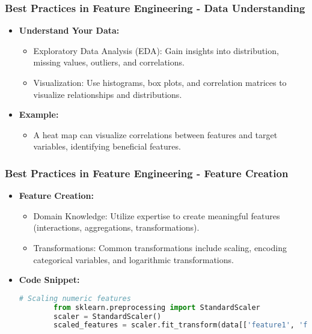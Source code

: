 \documentclass[aspectratio=169]{beamer}
\begin{document}
\begin{frame}[fragile]
    \frametitle{Best Practices in Feature Engineering - Data Understanding}
    \begin{itemize}
        \item \textbf{Understand Your Data:}
        \begin{itemize}
            \item Exploratory Data Analysis (EDA): Gain insights into distribution, missing values, outliers, and correlations.
            \item Visualization: Use histograms, box plots, and correlation matrices to visualize relationships and distributions.
        \end{itemize}
        \item \textbf{Example:} 
        \begin{itemize}
            \item A heat map can visualize correlations between features and target variables, identifying beneficial features.
        \end{itemize}
    \end{itemize}
\end{frame}

\begin{frame}[fragile]
    \frametitle{Best Practices in Feature Engineering - Feature Creation}
    \begin{itemize}
        \item \textbf{Feature Creation:}
        \begin{itemize}
            \item Domain Knowledge: Utilize expertise to create meaningful features (interactions, aggregations, transformations).
            \item Transformations: Common transformations include scaling, encoding categorical variables, and logarithmic transformations.
        \end{itemize}
        \item \textbf{Code Snippet:}
        \begin{lstlisting}[language=Python]
        # Scaling numeric features
        from sklearn.preprocessing import StandardScaler
        scaler = StandardScaler()
        scaled_features = scaler.fit_transform(data[['feature1', 'feature2']])
        \end{lstlisting}
    \end{itemize}
\end{frame}
\end{document}
